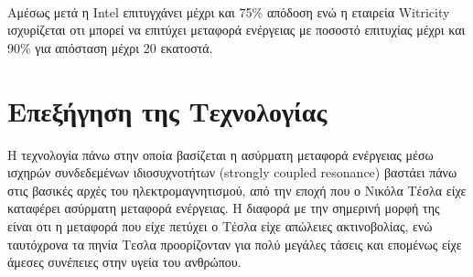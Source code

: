 Αμέσως μετά η Intel\textsuperscript{\textregistered} επιτυγχάνει μέχρι και 75\% απόδοση \cite{intel_recharg} ενώ η εταιρεία Witricity\textsuperscript{\textregistered}
ισχυρίζεται οτι μπορεί να επιτύχει μεταφορά ενέργειας με ποσοστό επιτυχίας μέχρι και 90\% \cite{witricity_90} για απόσταση μέχρι 20 εκατοστά.


\section{Επεξήγηση της Τεχνολογίας}
Η τεχνολογία πάνω στην οποία βασίζεται η ασύρματη μεταφορά ενέργειας μέσω ισχηρών συνδεδεμένων ιδιοσυχνοτήτων (strongly coupled resonance) βαστάει πάνω στις βασικές
αρχές του ηλεκτρομαγνητισμού, από την εποχή που ο Νικόλα Τέσλα είχε καταφέρει ασύρματη μεταφορά ενέργειας. Η διαφορά με την σημερινή μορφή της είναι οτι
η μεταφορά που είχε πετύχει ο Τέσλα είχε απώλειες ακτινοβολίας, ενώ ταυτόχρονα τα πηνία Τεσλα προορίζονταν για πολύ μεγάλες τάσεις και επομένως είχε άμεσες συνέπειες
στην υγεία του ανθρώπου.

